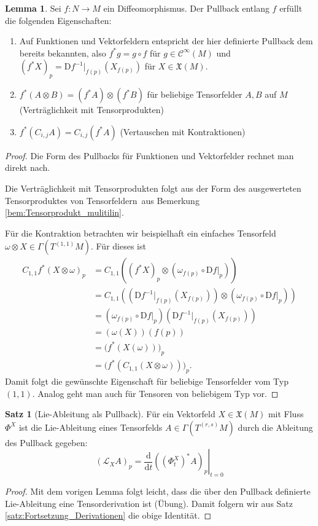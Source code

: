 \documentclass[a4paper]{scrreprt}
\numberwithin{equation}{chapter}
\newcommand{\D}{\mathrm{d}}
\newcommand{\DD}{\mathrm{D}}
\newcommand{\sC}{\mathcal{C}^{\infty}}
\newcommand{\vf}{\mathfrak{X}}
\theoremstyle{definition}
\newtheorem{lemma}[defn]{Lemma}
\newtheorem{satz}[defn]{Satz}
\begin{document}
		\begin{lemma}
			Sei $f\colon N\to M$ ein Diffeomorphismus. Der Pullback entlang $f$ erfüllt die folgenden Eigenschaften:
			\begin{enumerate}[label=(\roman*)]
				\item Auf Funktionen und Vektorfeldern entspricht der hier definierte Pullback dem bereits bekannten, also $f^*g = g\circ f$ für $g\in\sC(M)$ und $(f^*X)_p = \DD f^{-1}|_{f(p)} (X_{f(p)})$ für $X \in \vf(M)$.
				\item $f^*(A\otimes B) = (f^*A) \otimes (f^*B)$ für beliebige Tensorfelder $A,B$ auf $M$ (Verträglichkeit mit Tensorprodukten)
				\item $f^*(C_{i,j}A) = C_{i,j}(f^*A)$ (Vertauschen mit Kontraktionen)
			\end{enumerate}
			
			\begin{proof}
				Die Form des Pullbacks für Funktionen und Vektorfelder rechnet man direkt nach.
				
				Die Verträglichkeit mit Tensorprodukten folgt aus der Form des \glqq ausgewerteten Tensorproduktes von Tensorfeldern\grqq\ aus Bemerkung \ref{bem:Tensorprodukt_mulitilin}.
				
				Für die Kontraktion betrachten wir beispielhaft ein einfaches Tensorfeld $\omega \otimes X \in \Gamma(T^{(1,1)}M)$. Für dieses ist
				\begin{align*}
					C_{1,1}f^*(X\otimes\omega)_p &= C_{1,1} \left( (f^*X)_p \otimes \left(\omega_{f(p)} \circ \DD f\vert_p \right) \right)\\
					&= C_{1,1} \left( \left(\DD f^{-1}|_{f(p)} (X_{f(p)})\right) \otimes \left(\omega_{f(p)} \circ \DD f\vert_p \right) \right)\\
					&= \left(\omega_{f(p)} \circ \DD f\vert_p \right) \left(\DD f^{-1}|_{f(p)} (X_{f(p)})\right)\\
					&= (\omega(X))(f(p))\\
					&= \Big( f^*(X(\omega)) \Big)_p\\
					&= \Big( f^*(C_{1,1}(X\otimes\omega)) \Big)_p.
				\end{align*}
				Damit folgt die gewünschte Eigenschaft für beliebige Tensorfelder vom Typ $(1,1)$. Analog geht man auch für Tensoren von beliebigem Typ vor.
			\end{proof}
		\end{lemma}
		
		\begin{satz}[Lie-Ableitung als Pullback]
			Für ein Vektorfeld $X\in\vf(M)$ mit Fluss $\Phi^X$ ist die Lie-Ableitung eines Tensorfelds $A\in \Gamma(T^{(r,s)}M)$ durch die Ableitung des Pullback gegeben:
			\[(\mathcal{L}_X A)_p = \left.\frac{\D}{\D t} \left((\Phi^X_t)^*A\right)_p \right|_{t=0}\]
			\begin{proof}
				Mit dem vorigen Lemma folgt leicht, dass die über den Pullback definierte Lie-Ableitung eine Tensorderivation ist (Übung). Damit folgern wir aus Satz \ref{satz:Fortsetzung_Derivationen} die obige Identität.
			\end{proof}
		\end{satz}
\end{document}
